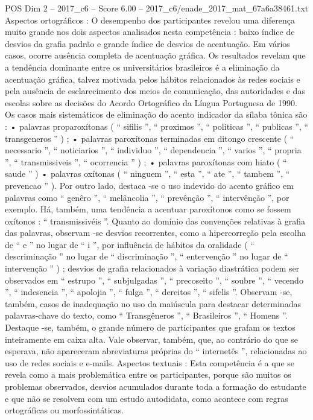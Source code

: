 \begin{textsample}{POS Dim 2 – 2017\_c6 – Score 6.00 – 2017\_c6/enade\_2017\_mat\_67a6a38461.txt}
Aspectos ortográficos : O desempenho dos participantes revelou uma diferença muito grande nos dois aspectos analisados nesta competência : baixo índice de desvios da grafia padrão e grande índice de desvios de acentuação.
Em vários casos, ocorre ausência completa de acentuação gráfica.
Os resultados revelam que a tendência dominante entre os universitários brasileiros é a eliminação da acentuação gráfica, talvez motivada pelos hábitos relacionados às redes sociais e pela ausência de esclarecimento dos meios de comunicação, das autoridades e das escolas sobre as decisões do Acordo Ortográfico da Língua Portuguesa de 1990.
Os casos mais sistemáticos de eliminação do acento indicador da sílaba tônica são : • palavras proparoxítonas ( “ sifilis ”, “ proximos ”, “ politicas ”, “ publicas ”, “ transgeneros ” ) ; • palavras paroxítonas terminadas em ditongo crescente ( “ necessario ”, “ noticiarios ”, “ individuo ”, “ dependencia ”, “ varios ”, “ propria ”, “ transmissiveis ”, “ ocorrencia ” ) ; • palavras paroxítonas com hiato ( “ saude ” ) • palavras oxítonas ( “ ninguem ”, “ esta ”, “ ate ”, “ tambem ”, “ prevencao ” ).
Por outro lado, destaca -se o uso indevido do acento gráfico em palavras como “ genêro ”, “ melâncolia ”, “ prevênção ”, “ intervênção ”, por exemplo.
Há, também, uma tendência a acentuar paroxítonos como se fossem oxítonos : “ transmissivéis ”.
Quanto ao domínio das convenções relativas à grafia das palavras, observam -se desvios recorrentes, como a hipercorreção pela escolha de “ e ” no lugar de “ i ”, por influência de hábitos da oralidade ( “ descriminação ” no lugar de “ discriminação ”, “ entervenção ” no lugar de “ intervenção ” ) ; desvios de grafia relacionados à variação diastrática podem ser observados em “ estrupo ”, “ subjulgadas ”, “ precoseito ”, “ soubre ”, “ vecendo ”, “ indesencia ”, “ apolojia ”, “ fulga ”, “ dereitos ”, “ sifelis ”.
Observam -se, também, casos de inadequação no uso da maiúscula para destacar determinadas palavras-chave do texto, como “ Transgêneros ”, “ Brasileiros ”, “ Homens ”.
Destaque -se, também, o grande número de participantes que grafam os textos inteiramente em caixa alta.
Vale observar, também, que, ao contrário do que se esperava, não apareceram abreviaturas próprias do “ internetês ”, relacionadas ao uso de redes sociais e e-mails.
Aspectos textuais : Esta competência é a que se revela como a mais problemática entre os participantes, porque são muitos os problemas observados, desvios acumulados durante toda a formação do estudante e que não se resolvem com um estudo autodidata, como acontece com regras ortográficas ou morfossintáticas.

\end{textsample}
